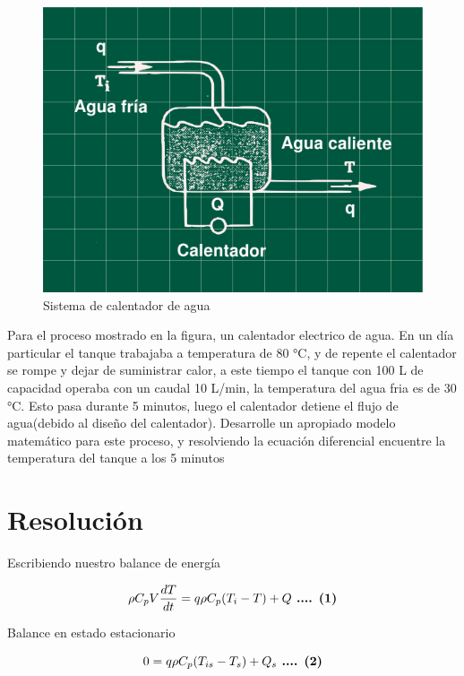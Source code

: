 \documentclass[
  letterpaper,
  DIV=11,
  numbers=noendperiod]{scrreprt}
\begin{document}
\begin{figure}

{\centering \includegraphics{././images/p5.1-babatunde/headercontrol51.png}

}

\caption{Sistema de calentador de agua}

\end{figure}

Para el proceso mostrado en la figura, un calentador electrico de agua.
En un día particular el tanque trabajaba a temperatura de 80 °C, y de
repente el calentador se rompe y dejar de suministrar calor, a este
tiempo el tanque con 100 L de capacidad operaba con un caudal 10 L/min,
la temperatura del agua fria es de 30 °C. Esto pasa durante 5 minutos,
luego el calentador detiene el flujo de agua(debido al diseño del
calentador). Desarrolle un apropiado modelo matemático para este
proceso, y resolviendo la ecuación diferencial encuentre la temperatura
del tanque a los 5 minutos

\hypertarget{resoluciuxf3n}{%
\section{Resolución}\label{resoluciuxf3n}}

Escribiendo nuestro balance de energía

\[
\rho C_p V \frac{dT}{dt}=q \rho C_p(T_i-T)+Q\space\space\space\textbf{ .... (1)}
\]

Balance en estado estacionario

\[
0 = q \rho C_p(T_{is}-T_s)+Q_s\space\space\space\textbf{ .... (2)}
\]
\end{document}
